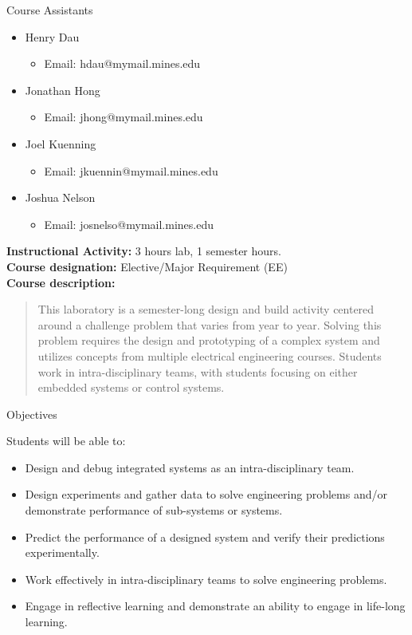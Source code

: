 \begin{frame}{Course Assistants}
\begin{itemize}
\item Henry Dau
\begin{itemize}
\item Email: hdau@mymail.mines.edu
\end{itemize}
\item Jonathan Hong
\begin{itemize}
\item Email: jhong@mymail.mines.edu
\end{itemize}
\item Joel Kuenning
\begin{itemize}
\item Email: jkuennin@mymail.mines.edu
\end{itemize}
\item Joshua Nelson
\begin{itemize}
\item Email: josnelso@mymail.mines.edu
\end{itemize}
\end{itemize}
\end{frame}

\noindent\textbf{Instructional Activity:} 3 hours lab, 1 semester hours.\\

\noindent\textbf{Course designation:} Elective/Major Requirement (EE)\\

\noindent\textbf{Course description:}
\begin{quote}
This laboratory is a semester-long design and build activity centered around a challenge problem that varies from year to year. Solving this problem requires the design and prototyping of a complex system and utilizes concepts from multiple electrical engineering courses. Students work in intra-disciplinary teams, with students focusing on either embedded systems or  control systems.
\end{quote}


\begin{frame}{Objectives}
\begin{block}{Students will be able to:}
\begin{itemize}
\item Design and debug integrated systems as an intra-disciplinary team.
\item Design experiments and gather data to solve engineering problems and/or demonstrate performance of sub-systems or systems.
\item Predict the performance of a designed system and verify their predictions experimentally.
\item Work effectively in intra-disciplinary teams to solve engineering problems.
\item Engage in reflective learning and demonstrate an ability to engage in life-long learning.
\end{itemize}
\end{block}
\end{frame}

